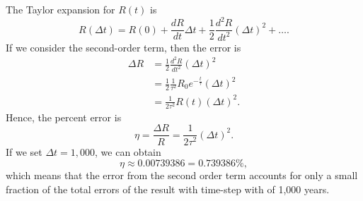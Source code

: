 \documentclass[a4paper]{article}
\begin{document}
	The Taylor expansion for $R(t)$ is 
	\begin{equation}
		R(\Delta t) = R(0) + \frac{dR}{dt} \Delta t + \frac{1}{2	}\frac{d^2R}{dt^2}(\Delta t)^2 + \dots.
	\end{equation}
	If we consider the second-order term, then the error is
	\begin{align}
		\Delta R &= \frac{1}{2}\frac{d^2R}{dt^2}(\Delta t)^2 \\
		 & = \frac{1}{2}\frac{1}{{\tau}^2} R_0 e^{- \frac{t}{\tau}} (\Delta t)^2\\
		 & = \frac{1}{2{\tau}^2}R(t)(\Delta t)^2.
	\end{align}
	Hence, the percent error is
	\begin{equation}
			\eta = \frac{\Delta R}{R} = \frac{1}{2{\tau}^2}(\Delta t)^2.
	\end{equation}
	If we set $\Delta t = 1,000$, we can obtain
	\begin{equation}
		\eta \approx 0.00739386 = 0.739386\%,
	\end{equation}
	which means that the error from the second order term accounts for only a small fraction of the total errors of the result with time-step with of 1,000 years.
\end{document}
